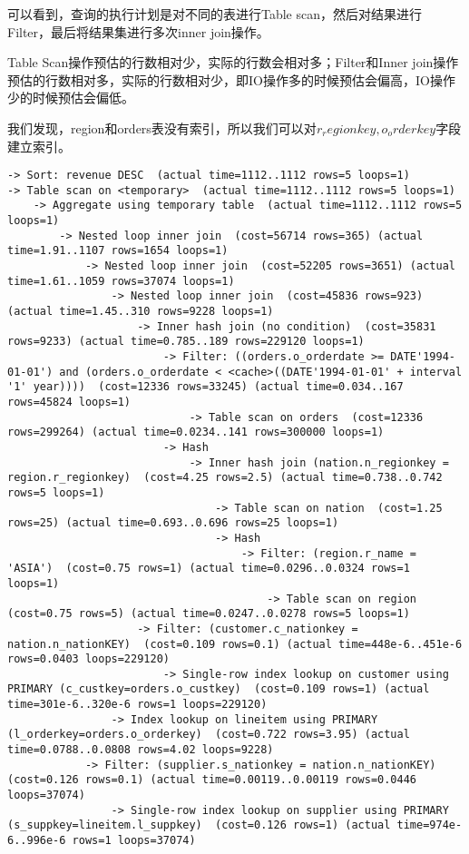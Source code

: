 \documentclass{article}
\begin{document}
可以看到，查询的执行计划是对不同的表进行Table scan，然后对结果进行Filter，最后将结果集进行多次inner join操作。

Table Scan操作预估的行数相对少，实际的行数会相对多；Filter和Inner join操作预估的行数相对多，实际的行数相对少，即IO操作多的时候预估会偏高，IO操作少的时候预估会偏低。

我们发现，region和orders表没有索引，所以我们可以对$r_regionkey,o_orderkey$字段建立索引。

\begin{lstlisting}
-> Sort: revenue DESC  (actual time=1112..1112 rows=5 loops=1)
-> Table scan on <temporary>  (actual time=1112..1112 rows=5 loops=1)
    -> Aggregate using temporary table  (actual time=1112..1112 rows=5 loops=1)
        -> Nested loop inner join  (cost=56714 rows=365) (actual time=1.91..1107 rows=1654 loops=1)
            -> Nested loop inner join  (cost=52205 rows=3651) (actual time=1.61..1059 rows=37074 loops=1)
                -> Nested loop inner join  (cost=45836 rows=923) (actual time=1.45..310 rows=9228 loops=1)
                    -> Inner hash join (no condition)  (cost=35831 rows=9233) (actual time=0.785..189 rows=229120 loops=1)
                        -> Filter: ((orders.o_orderdate >= DATE'1994-01-01') and (orders.o_orderdate < <cache>((DATE'1994-01-01' + interval '1' year))))  (cost=12336 rows=33245) (actual time=0.034..167 rows=45824 loops=1)
                            -> Table scan on orders  (cost=12336 rows=299264) (actual time=0.0234..141 rows=300000 loops=1)
                        -> Hash
                            -> Inner hash join (nation.n_regionkey = region.r_regionkey)  (cost=4.25 rows=2.5) (actual time=0.738..0.742 rows=5 loops=1)
                                -> Table scan on nation  (cost=1.25 rows=25) (actual time=0.693..0.696 rows=25 loops=1)
                                -> Hash
                                    -> Filter: (region.r_name = 'ASIA')  (cost=0.75 rows=1) (actual time=0.0296..0.0324 rows=1 loops=1)
                                        -> Table scan on region  (cost=0.75 rows=5) (actual time=0.0247..0.0278 rows=5 loops=1)
                    -> Filter: (customer.c_nationkey = nation.n_nationKEY)  (cost=0.109 rows=0.1) (actual time=448e-6..451e-6 rows=0.0403 loops=229120)
                        -> Single-row index lookup on customer using PRIMARY (c_custkey=orders.o_custkey)  (cost=0.109 rows=1) (actual time=301e-6..320e-6 rows=1 loops=229120)
                -> Index lookup on lineitem using PRIMARY (l_orderkey=orders.o_orderkey)  (cost=0.722 rows=3.95) (actual time=0.0788..0.0808 rows=4.02 loops=9228)
            -> Filter: (supplier.s_nationkey = nation.n_nationKEY)  (cost=0.126 rows=0.1) (actual time=0.00119..0.00119 rows=0.0446 loops=37074)
                -> Single-row index lookup on supplier using PRIMARY (s_suppkey=lineitem.l_suppkey)  (cost=0.126 rows=1) (actual time=974e-6..996e-6 rows=1 loops=37074)
\end{lstlisting}
\end{document}
